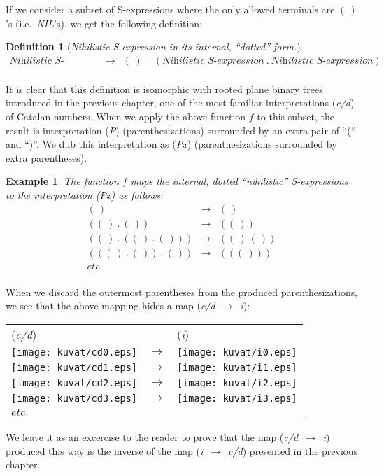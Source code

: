 \documentclass[11pt]{article} %
\newcommand{\catint}[1]{({\it #1})}
\def\catintmap#1#2{({\it #1}~$\rightarrow$~{\it #2})}
\newtheorem{example}[theorem]{Example}
\newtheorem{definition}[theorem]{Definition}
\newcommand{\nsexpr}{\ensuremath{\textit{Nihilistic~S-expression}}\xspace}
\newcommand{\nilatom}{\ensuremath{\mathbf{(~)}}\xspace}
\newcommand{\ra}{\ensuremath{\rightarrow}\xspace}
\begin{document}
If we consider a subset of S-expressions where the only
allowed terminals are \nilatom's (i.e.~\emph{NIL}'s),
we get the following definition:
\begin{definition}[{\it Nihilistic S-expression in its internal, ``dotted'' form.}]
$$
\begin{array}{rll}
\nsexpr & \ra & \nilatom~~\vert~~(\nsexpr~.~\nsexpr) \\
\end{array}
$$
\end{definition}
It is clear that this definition is isomorphic with 
rooted plane binary trees introduced in the previous chapter,
one of the most familiar interpretations
\catint{c/d} of Catalan numbers.
When we apply the above function $f$ to this subset,
the result is interpretation \catint{P} (parenthesizations)
surrounded by an extra pair of ``(`` and ``)''. We dub this
interpretation as \catint{Px} (parenthesizations surrounded
by extra parentheses).
\begin{example}
The function $f$ maps the internal, dotted ``nihilistic''
S-expressions to the interpretation \catint{Px} as follows:
$$
\begin{array}{lll}
\nilatom & \ra & \nilatom \\
(\nilatom~.~\nilatom) & \ra & (\nilatom) \\
(\nilatom~.~(\nilatom~.~\nilatom)) & \ra & (\nilatom~\nilatom) \\
((\nilatom~.~\nilatom)~.~\nilatom) & \ra & ((\nilatom)) \\
etc.\\
\end{array}
$$
\end{example}
When we discard the outermost parentheses from the produced
parenthesizations, we see that the above mapping hides
a map \catintmap{c/d}{i}:
\begin{center}
\begin{tabular}{l l l}
\catint{c/d} & & \catint{i} \\
\texttt{[image: kuvat/cd0.eps]} \vspace{0.1in} & \ra & \texttt{[image: kuvat/i0.eps]} \\
\texttt{[image: kuvat/cd1.eps]} \vspace{0.1in} & \ra & \texttt{[image: kuvat/i1.eps]} \\
\texttt{[image: kuvat/cd2.eps]} \vspace{0.1in} & \ra & \texttt{[image: kuvat/i2.eps]} \\
\texttt{[image: kuvat/cd3.eps]} \vspace{0.1in} & \ra & \texttt{[image: kuvat/i3.eps]} \\
\ensuremath{\mathit{etc.}}\\
\end{tabular}
\end{center}
We leave it as an excercise to the reader to prove
that the map \catintmap{c/d}{i} produced this way
is the inverse of the map \catintmap{i}{c/d}
presented in the previous chapter.
%
\end{document}
